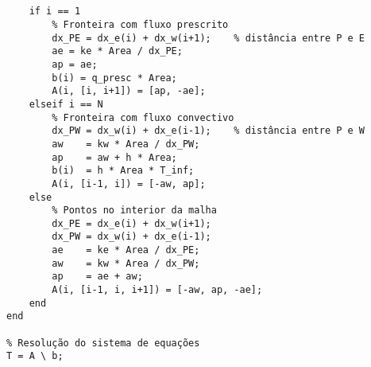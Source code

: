 \begin{verbatim}
 
 
    if i == 1
        % Fronteira com fluxo prescrito
        dx_PE = dx_e(i) + dx_w(i+1);    % distância entre P e E
        ae = ke * Area / dx_PE;
        ap = ae;
        b(i) = q_presc * Area;
        A(i, [i, i+1]) = [ap, -ae];
    elseif i == N
        % Fronteira com fluxo convectivo
        dx_PW = dx_w(i) + dx_e(i-1);    % distância entre P e W
        aw    = kw * Area / dx_PW;
        ap    = aw + h * Area;
        b(i)  = h * Area * T_inf;
        A(i, [i-1, i]) = [-aw, ap];
    else
        % Pontos no interior da malha
        dx_PE = dx_e(i) + dx_w(i+1);
        dx_PW = dx_w(i) + dx_e(i-1);
        ae    = ke * Area / dx_PE;
        aw    = kw * Area / dx_PW;
        ap    = ae + aw;
        A(i, [i-1, i, i+1]) = [-aw, ap, -ae];
    end
end

% Resolução do sistema de equações
T = A \ b;
\end{verbatim}